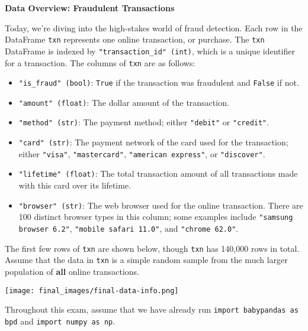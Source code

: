 \documentclass[twoside,12pt]{article}
\begin{document}
\thispagestyle{empty}

\begin{center}
    \noindent \textbf{\large{Data Overview: Fraudulent Transactions}} 
\end{center}

\vspace{.25in}

\noindent Today, we're diving into the high-stakes world of fraud detection. Each row in the DataFrame \texttt{txn} represents one online transaction, or purchase. The \texttt{txn} DataFrame is indexed by \texttt{"transaction\_id" (int)}, which is a unique identifier for a transaction. The columns of \texttt{txn} are as follows:
\begin{itemize}
    \item \texttt{"is\_fraud" (bool)}: \texttt{True} if the transaction was fraudulent and \texttt{False} if not.
    \item \texttt{"amount" (float)}: The dollar amount of the transaction.
    \item \texttt{"method" (str)}: The payment method; either \texttt{"debit"} or \texttt{"credit"}.
    \item \texttt{"card" (str)}: The payment network of the card used for the transaction; either \texttt{"visa"}, \texttt{"mastercard"}, \texttt{"american express"}, or \texttt{"discover"}.
    \item \texttt{"lifetime" (float)}: The total transaction amount of all transactions made with this card over its lifetime.
    \item \texttt{"browser" (str)}: The web browser used for the online transaction. There are 100 distinct browser types in this column; some examples include \texttt{"samsung browser 6.2"}, \texttt{"mobile safari 11.0"}, and \texttt{"chrome 62.0"}.
    
\end{itemize}
\vspace{.2in}

\noindent The first few rows of \texttt{txn} are shown below, though \texttt{txn} has 140,000 rows in total. Assume that the data in \texttt{txn} is a simple random sample from the much larger population of \textbf{all} online transactions.


\begin{center}
\texttt{[image: final\_images/final-data-info.png]}
\end{center}

\noindent Throughout this exam, assume that we have already run \texttt{import babypandas as bpd} and \texttt{import numpy as np}.
\end{document}
